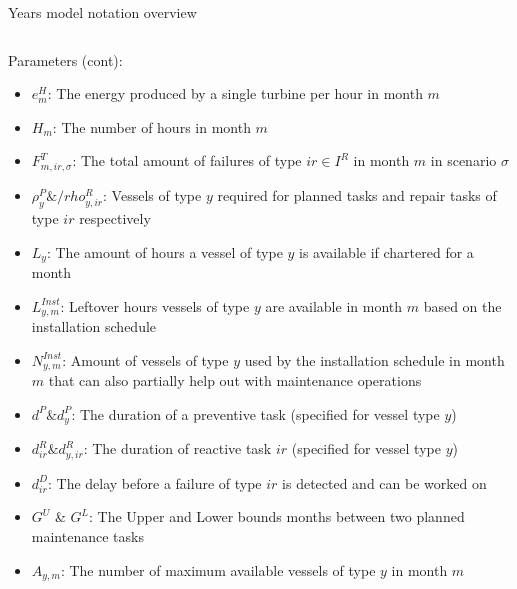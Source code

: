 \documentclass{beamer}
\begin{document}
\begin{frame}{Years model notation overview}
\begin{columns}
\begin{column}{.48\textwidth}
Parameters (cont):
\begin{itemize}
\item $e^H_m$: The energy produced by a single turbine per hour in month $m$
\item $H_m$: The number of hours in month $m$
\item $F^T_{m,ir,\sigma}$: The total amount of failures of type $ir \in I^R$ in month $m$ in scenario $\sigma$
\item $\rho^P_y \& /rho^R_{y, ir}$: Vessels of type $y$ required for planned tasks and repair tasks of type $ir$ respectively
\item $L_y$: The amount of hours a vessel of type $y$ is available if chartered for a month
\item $L^{Inst}_{y,m}$: Leftover hours vessels of type $y$ are available in month $m$ based on the installation schedule
\item $N^{Inst}_{y,m}$: Amount of vessels of type $y$ used by the installation schedule in month $m$ that can also partially help out with maintenance operations
\item $d^P \& d^P_y$: The duration of a preventive task (specified for vessel type $y$)
\item $d^R_{ir} \& d^R_{y,ir}$: The duration of reactive task $ir$ (specified for vessel type $y$)
\item $d^D_{ir}$: The delay before a failure of type $ir$ is detected and can be worked on
\item $G^U$ \& $G^L$: The Upper and Lower bounds months between two planned maintenance tasks
\item $A_{y,m}$: The number of maximum available vessels of type $y$ in month $m$
\end{itemize}
\end{column}
\end{columns}
\end{frame}

\end{document}
